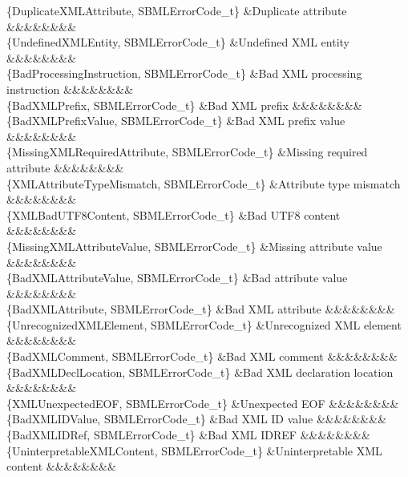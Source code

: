 \begin{DoxyParagraph}{}
\begin{longtabu}
\{Duplicate\+X\+M\+L\+Attribute, S\+B\+M\+L\+Error\+Code\+\_\+t\} &Duplicate attribute &&&&&&&&\\
\{Undefined\+X\+M\+L\+Entity, S\+B\+M\+L\+Error\+Code\+\_\+t\} &Undefined X\+ML entity &&&&&&&&\\
\{Bad\+Processing\+Instruction, S\+B\+M\+L\+Error\+Code\+\_\+t\} &Bad X\+ML processing instruction &&&&&&&&\\
\{Bad\+X\+M\+L\+Prefix, S\+B\+M\+L\+Error\+Code\+\_\+t\} &Bad X\+ML prefix &&&&&&&&\\
\{Bad\+X\+M\+L\+Prefix\+Value, S\+B\+M\+L\+Error\+Code\+\_\+t\} &Bad X\+ML prefix value &&&&&&&&\\
\{Missing\+X\+M\+L\+Required\+Attribute, S\+B\+M\+L\+Error\+Code\+\_\+t\} &Missing required attribute &&&&&&&&\\
\{X\+M\+L\+Attribute\+Type\+Mismatch, S\+B\+M\+L\+Error\+Code\+\_\+t\} &Attribute type mismatch &&&&&&&&\\
\{X\+M\+L\+Bad\+U\+T\+F8\+Content, S\+B\+M\+L\+Error\+Code\+\_\+t\} &Bad U\+T\+F8 content &&&&&&&&\\
\{Missing\+X\+M\+L\+Attribute\+Value, S\+B\+M\+L\+Error\+Code\+\_\+t\} &Missing attribute value &&&&&&&&\\
\{Bad\+X\+M\+L\+Attribute\+Value, S\+B\+M\+L\+Error\+Code\+\_\+t\} &Bad attribute value &&&&&&&&\\
\{Bad\+X\+M\+L\+Attribute, S\+B\+M\+L\+Error\+Code\+\_\+t\} &Bad X\+ML attribute &&&&&&&&\\
\{Unrecognized\+X\+M\+L\+Element, S\+B\+M\+L\+Error\+Code\+\_\+t\} &Unrecognized X\+ML element &&&&&&&&\\
\{Bad\+X\+M\+L\+Comment, S\+B\+M\+L\+Error\+Code\+\_\+t\} &Bad X\+ML comment &&&&&&&&\\
\{Bad\+X\+M\+L\+Decl\+Location, S\+B\+M\+L\+Error\+Code\+\_\+t\} &Bad X\+ML declaration location &&&&&&&&\\
\{X\+M\+L\+Unexpected\+E\+OF, S\+B\+M\+L\+Error\+Code\+\_\+t\} &Unexpected E\+OF &&&&&&&&\\
\{Bad\+X\+M\+L\+I\+D\+Value, S\+B\+M\+L\+Error\+Code\+\_\+t\} &Bad X\+ML ID value &&&&&&&&\\
\{Bad\+X\+M\+L\+I\+D\+Ref, S\+B\+M\+L\+Error\+Code\+\_\+t\} &Bad X\+ML I\+D\+R\+EF &&&&&&&&\\
\{Uninterpretable\+X\+M\+L\+Content, S\+B\+M\+L\+Error\+Code\+\_\+t\} &Uninterpretable X\+ML content &&&&&&&&\\

\end{longtabu}
\end{DoxyParagraph}

